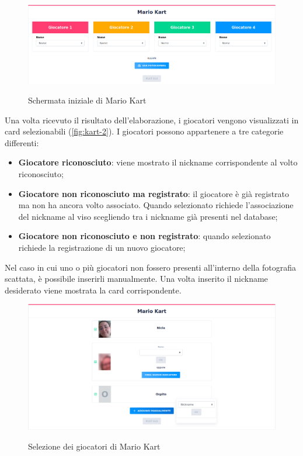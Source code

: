 		\begin{figure}[H]
			\centering
			\includegraphics[width=\textwidth]{immagini/kart-1.png} \\
			\caption{\label{fig:kart-1} Schermata iniziale di Mario Kart}
		\end{figure}
		
		\noindent Una volta ricevuto il risultato dell'elaborazione, i giocatori vengono visualizzati in card selezionabili (\autoref{fig:kart-2}). I giocatori possono appartenere a tre categorie differenti:
		\begin{itemize}
			\item \textbf{Giocatore riconosciuto}: viene mostrato il nickname corrispondente al volto riconosciuto;
			\item \textbf{Giocatore non riconosciuto ma registrato}: il giocatore è già registrato ma non ha ancora volto associato. Quando selezionato richiede l'associazione del nickname al viso scegliendo tra i nickname già presenti nel database; 
			\item\textbf{Giocatore non riconosciuto e non registrato}: quando selezionato richiede la registrazione di un nuovo giocatore; 
		\end{itemize} 
	
		\noindent Nel caso in cui uno o più giocatori non fossero presenti all'interno della fotografia scattata, è possibile inserirli manualmente. Una volta inserito il nickname desiderato viene mostrata la card corrispondente.
		
		\begin{figure}[H]
			\centering
			\includegraphics[width=\textwidth]{immagini/kart-2.png} \\
			\caption{\label{fig:kart-2} Selezione dei giocatori di Mario Kart}
		\end{figure}
	
		
